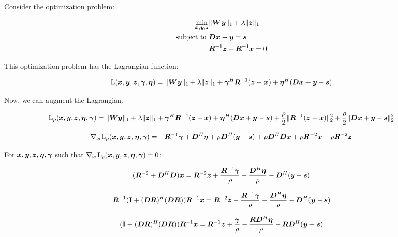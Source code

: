 \documentclass{article}
\begin{document}
Consider the optimization problem:

\begin{equation}
\begin{aligned}
\min_{\bm{x},\bm{y},\bm{z}} & \|\bm{W}\bm{y}\|_1 + \lambda\|\bm{z}\|_1 \\
\text{subject to } & \bm{D}\bm{x} + \bm{y} = \bm{s} \\
                   &  \bm{R}^{-1}\bm{z} - \bm{R}^{-1}\bm{x} = 0
\end{aligned}
\end{equation}

This optimization problem has the Lagrangian function:

\begin{equation}
\operatorname{L}(\bm{x},\bm{y},\bm{z},\bm{\gamma},\bm{\eta}) = \|\bm{W}\bm{y}\|_1 + \lambda\|\bm{z}\|_1 + \bm{\gamma}^H\bm{R}^{-1}(\bm{z} - \bm{x}) + \bm{\eta}^H(\bm{D}\bm{x} + \bm{y} - \bm{s})
\end{equation}

Now, we can augment the Lagrangian.

\begin{equation}
\operatorname{L}_{\rho}(\bm{x},\bm{y},\bm{z},\bm{\eta},\bm{\gamma}) = \|\bm{W}\bm{y}\|_1 + \lambda\|\bm{z}\|_1 + \bm{\gamma}^H\bm{R}^{-1}(\bm{z} - \bm{x}) + \bm{\eta}^H(\bm{D}\bm{x} + \bm{y} - \bm{s}) + \frac{\rho}{2}\|\bm{R}^{-1}(\bm{z} - \bm{x})\|_2^2 + \frac{\rho}{2}\|\bm{D}\bm{x} + \bm{y} - \bm{s}\|_2^2
\end{equation} 

\begin{equation}
\nabla_{\bm{x}}\operatorname{L}_{\rho}(\bm{x},\bm{y},\bm{z},\bm{\eta},\bm{\gamma}) = -\bm{R}^{-1}\bm{\gamma} + \bm{D}^H\bm{\eta} + \rho\bm{D}^H(\bm{y} - \bm{s}) + \rho\bm{D}^H\bm{D}\bm{x} + \rho\bm{R}^{-2}\bm{x} - \rho\bm{R}^{-2}\bm{z}
\end{equation}

For $\bm{x},\bm{y},\bm{z},\bm{\eta},\bm{\gamma}$ such that $\nabla_{\bm{x}}\operatorname{L}_{\rho}(\bm{x},\bm{y},\bm{z},\bm{\eta},\bm{\gamma}) = 0$:

\begin{equation}
(\bm{R}^{-2} + \bm{D}^H\bm{D})\bm{x} = \bm{R}^{-2}\bm{z} + \frac{\bm{R}^{-1} \bm{\gamma}}{\rho} - \frac{\bm{D}^H\bm{\eta}}{\rho} - \bm{D}^H(\bm{y} - \bm{s})
\end{equation}

\begin{equation}
\bm{R}^{-1}({\bf I} + (\bm{D}\bm{R})^H(\bm{D}\bm{R}))\bm{R}^{-1}\bm{x} = \bm{R}^{-2}\bm{z} + \frac{\bm{R}^{-1} \bm{\gamma}}{\rho} - \frac{\bm{D}^H\bm{\eta}}{\rho} - \bm{D}^H(\bm{y} - \bm{s})
\end{equation}

\begin{equation}
({\bf I} + (\bm{D}\bm{R})^H(\bm{D}\bm{R}))\bm{R}^{-1}\bm{x} = \bm{R}^{-1}\bm{z} + \frac{\bm{\gamma}}{\rho} - \frac{\bm{R}\bm{D}^H\bm{\eta}}{\rho} - \bm{R}\bm{D}^H(\bm{y} - \bm{s})
\end{equation}
\end{document}
